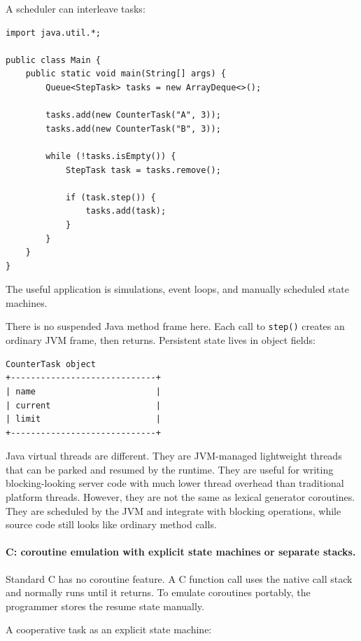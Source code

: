 A scheduler can interleave tasks:

\begin{verbatim}
import java.util.*;

public class Main {
    public static void main(String[] args) {
        Queue<StepTask> tasks = new ArrayDeque<>();

        tasks.add(new CounterTask("A", 3));
        tasks.add(new CounterTask("B", 3));

        while (!tasks.isEmpty()) {
            StepTask task = tasks.remove();

            if (task.step()) {
                tasks.add(task);
            }
        }
    }
}
\end{verbatim}

The useful application is simulations, event loops, and manually scheduled state machines.

There is no suspended Java method frame here. Each call to \texttt{step()} creates an ordinary JVM frame, then returns. Persistent state lives in object fields:

\begin{verbatim}
CounterTask object
+-----------------------------+
| name                        |
| current                     |
| limit                       |
+-----------------------------+
\end{verbatim}

Java virtual threads are different. They are JVM-managed lightweight threads that can be parked and resumed by the runtime. They are useful for writing blocking-looking server code with much lower thread overhead than traditional platform threads. However, they are not the same as lexical generator coroutines. They are scheduled by the JVM and integrate with blocking operations, while source code still looks like ordinary method calls.

\paragraph{C: coroutine emulation with explicit state machines or separate stacks.}

Standard C has no coroutine feature. A C function call uses the native call stack and normally runs until it returns. To emulate coroutines portably, the programmer stores the resume state manually.

A cooperative task as an explicit state machine:

